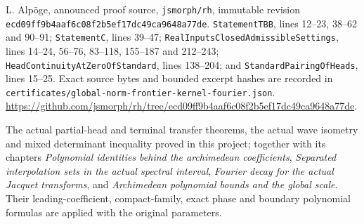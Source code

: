 L. Alp\"oge, announced proof source, \texttt{jsmorph/rh}, immutable
revision \texttt{ecd09ff9b4aaf6c08f2b5ef17dc49ca9648a77de}.
\texttt{StatementTBB}, lines 12--23, 38--62 and 90--91;
\texttt{StatementC}, lines 39--47;
\texttt{RealInputsClosedAdmissibleSettings}, lines 14--24,
56--76, 83--118, 155--187 and 212--243;
\texttt{HeadContinuityAtZeroOfStandard}, lines 138--204;
and \texttt{StandardPairingOfHeads}, lines 15--25.
Exact source bytes and bounded excerpt hashes are recorded in
\texttt{certificates/global-norm-frontier-kernel-fourier.json}.
\url{https://github.com/jsmorph/rh/tree/ecd09ff9b4aaf6c08f2b5ef17dc49ca9648a77de}.

The actual partial-head and terminal transfer theorems, the actual
wave isometry and mixed determinant inequality proved in this
project; together with its chapters
\emph{Polynomial identities behind the archimedean coefficients},
\emph{Separated interpolation sets in the actual spectral interval},
\emph{Fourier decay for the actual Jacquet transforms}, and
\emph{Archimedean polynomial bounds and the global scale}.
Their leading-coefficient, compact-family, exact phase and boundary
polynomial formulas are applied with the original parameters.
